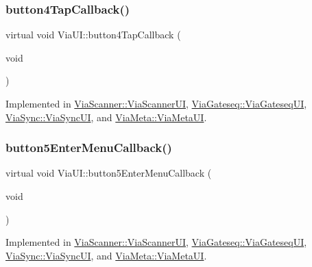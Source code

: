 \mbox{\label{class_via_u_i_a4925f089aa720ca88d84246f434112e9}} 
\subsubsection{\texorpdfstring{button4\+Tap\+Callback()}{button4TapCallback()}}
{\footnotesize\ttfamily virtual void Via\+U\+I\+::button4\+Tap\+Callback (\begin{DoxyParamCaption}\item[{void}]{ }\end{DoxyParamCaption})\hspace{0.3cm}{\ttfamily [pure virtual]}}



Implemented in \mbox{\hyperlink{class_via_scanner_1_1_via_scanner_u_i_a31a0153f6ca3260241e7c7373723bfb8}{Via\+Scanner\+::\+Via\+Scanner\+UI}}, \mbox{\hyperlink{class_via_gateseq_1_1_via_gateseq_u_i_a329721a8753f915ba96248fab6da7b60}{Via\+Gateseq\+::\+Via\+Gateseq\+UI}}, \mbox{\hyperlink{class_via_sync_1_1_via_sync_u_i_a00ba5badfeedc792a05f3e3c0ac19d73}{Via\+Sync\+::\+Via\+Sync\+UI}}, and \mbox{\hyperlink{class_via_meta_1_1_via_meta_u_i_a0c745451e4e0b8bc51546280595b5b28}{Via\+Meta\+::\+Via\+Meta\+UI}}.

\mbox{\label{class_via_u_i_adb40844fb1fa8e623f3a7eaecdbfad53}} 
\subsubsection{\texorpdfstring{button5\+Enter\+Menu\+Callback()}{button5EnterMenuCallback()}}
{\footnotesize\ttfamily virtual void Via\+U\+I\+::button5\+Enter\+Menu\+Callback (\begin{DoxyParamCaption}\item[{void}]{ }\end{DoxyParamCaption})\hspace{0.3cm}{\ttfamily [pure virtual]}}



Implemented in \mbox{\hyperlink{class_via_scanner_1_1_via_scanner_u_i_a337284dc48950fd3140b40ecca57122b}{Via\+Scanner\+::\+Via\+Scanner\+UI}}, \mbox{\hyperlink{class_via_gateseq_1_1_via_gateseq_u_i_a6286441705681c57d4f8535d0445b360}{Via\+Gateseq\+::\+Via\+Gateseq\+UI}}, \mbox{\hyperlink{class_via_sync_1_1_via_sync_u_i_ad02cd6e9495afcd256a3b3475809bf5b}{Via\+Sync\+::\+Via\+Sync\+UI}}, and \mbox{\hyperlink{class_via_meta_1_1_via_meta_u_i_af14bee3824185ab5a97d8745e9317370}{Via\+Meta\+::\+Via\+Meta\+UI}}.

